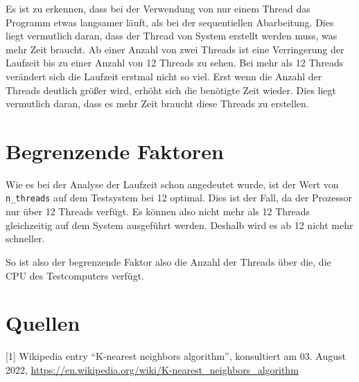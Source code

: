 \documentclass[12pt,a4paper]{article}
\begin{document}
Es ist zu erkennen, dass bei der Verwendung von nur einem Thread das Programm etwas langsamer läuft, als bei der sequentiellen Abarbeitung.
Dies liegt vermutlich daran, dass der Thread von System erstellt werden muss, was mehr Zeit braucht.
Ab einer Anzahl von zwei Threads ist eine Verringerung der Laufzeit bis zu einer Anzahl von 12 Threads zu sehen.
Bei mehr als 12 Threads verändert sich die Laufzeit erstmal nicht so viel.
Erst wenn die Anzahl der Threads deutlich größer wird, erhöht sich die benötigte Zeit wieder.
Dies liegt vermutlich daran, dass es mehr Zeit braucht diese Threads zu erstellen.

\section{Begrenzende Faktoren}

Wie es bei der Analyse der Laufzeit schon angedeutet wurde, ist der Wert von \texttt{n\_threads} auf dem Testsystem bei 12 optimal.
Dies ist der Fall, da der Prozessor nur über 12 Threads verfügt. Es können also nicht mehr als 12 Threads gleichzeitig auf dem System ausgeführt werden.
Deshalb wird es ab 12 nicht mehr schneller.

So ist also der begrenzende Faktor also die Anzahl der Threads über die, die CPU des Testcomputers verfügt.

\newpage
\thispagestyle{empty}

\section*{Quellen}

{\parindent0pt%
  
[1] Wikipedia entry ``K-nearest neighbors algorithm'', konsultiert am
03. August 2022,
\url{https://en.wikipedia.org/wiki/K-nearest_neighbors_algorithm}

}
\end{document}
